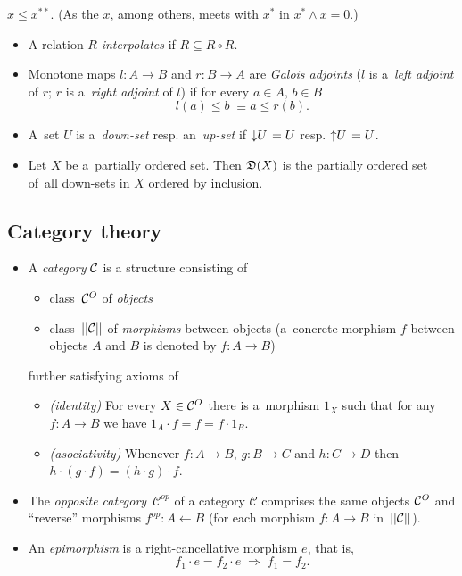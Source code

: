 \begin{fact}
  $x \le x^{**}$.
  (As the $x$, among others, meets with $x^*$ in $x^* \wedge x = 0$.)
\end{fact}

\begin{itemize}
\item A relation $R$ \emph{interpolates} if $R \subseteq R \circ R$.

\item Monotone maps $l\colon A \to B$ and $r\colon B \to A$ are \emph{Galois
  adjoints\/} ($l$ is a~\emph{left adjoint\/} of $r$; $r$ is a~\emph{right
  adjoint\/} of $l$) if for every $a\in A, \, b\in B$
  \[
    l(a) \le b \; \equiv a \le r(b).
  \]

\item A~set $U$ is a~\emph{down-set\/} resp. an~\emph{up-set\/} if
$\left\downarrow U \right. = U$ resp. $\left\uparrow U \right. = U$.

\item Let $X$ be a~partially ordered set.
Then $\mathfrak{D}(X)$ is the partially ordered set of~all down-sets in $X$ ordered by
inclusion.

\end{itemize}

\subsection*{Category theory}

\begin{itemize}
\item A \emph{category} $\mathcal{C}$ is a structure consisting of
  \begin{itemize}
  \item class~$\mathcal{C}^O$ of \emph{objects\/}
  \item class~$||\mathcal{C}||$ of \emph{morphisms\/} between objects 
  (a~concrete morphism $f$ between objects $A$ and $B$ is denoted by $f\colon A
   \to B$)
  \end{itemize}
further satisfying axioms of
  \begin{itemize}
  \item \emph{(identity)\/}
  For every $X\in \mathcal{C}^O$ there is a~morphism $1_X$ such that for any $f\colon A \to B$
  we have $1_A \cdot f = f = f \cdot 1_B$.
  \item \emph{(asociativity)\/}
  Whenever $f\colon A \to B$, $g\colon B \to C$ and $h\colon C \to D$ then $h
  \cdot (g \cdot f) = (h \cdot g) \cdot f$.
  \end{itemize}

\item The \emph{opposite category}~$\mathcal{C}^{op}$ of a category
$\mathcal{C}$ comprises the same objects $\mathcal{C}^O$ and ``reverse'' morphisms
$f^{op}\colon A \leftarrow B$ (for each morphism $f\colon A \to B$
in~$||\mathcal{C}||$).

\item An \emph{epimorphism} is a right-cancellative morphism $e$, that is,
\[
  f_1 \cdot e = f_2 \cdot e \; \Longrightarrow \; f_1 = f_2.
\]
\end{itemize}

